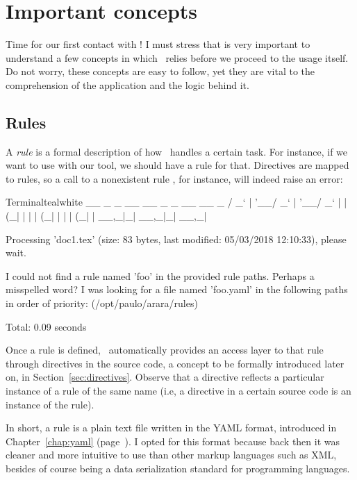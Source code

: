 \chapter{Important concepts}
\label{chap:importantconcepts}

Time for our first contact with \arara! I must stress that is very important to understand a few concepts in which \arara\ relies before we proceed to the usage itself. Do not worry, these concepts are easy to follow, yet they are vital to the comprehension of the application and the logic behind it.

\section{Rules}
\label{sec:rule}

A \emph{rule} is a formal description of how \arara\ handles a certain task. For instance, if we want to use  with our tool, we should have a rule for that. Directives are mapped to rules, so a call to a nonexistent rule , for instance, will indeed raise an error:

\begin{codebox}{Terminal}{teal}{\icnote}{white}
  __ _ _ __ __ _ _ __ __ _ 
 / _` | '__/ _` | '__/ _` |
| (_| | | | (_| | | | (_| |
 \__,_|_|  \__,_|_|  \__,_|

Processing 'doc1.tex' (size: 83 bytes, last modified: 05/03/2018
12:10:33), please wait.

I could not find a rule named 'foo' in the provided rule paths.
Perhaps a misspelled word? I was looking for a file named
'foo.yaml' in the following paths in order of priority:
(/opt/paulo/arara/rules)

Total: 0.09 seconds
\end{codebox}

Once a rule is defined, \arara\ automatically provides an access layer to that rule through directives in the source code, a concept to be formally introduced later on, in Section~\ref{sec:directives}. Observe that a directive reflects a particular instance of a rule of the same name (i.e, a  directive in a certain source code is an instance of the  rule).

In short, a rule is a plain text file written in the YAML format, introduced in Chapter~\ref{chap:yaml} (page~\pageref{chap:yaml}). I opted for this format because back then it was cleaner and more intuitive to use than other markup languages such as XML, besides of course being a data serialization standard for programming languages.

